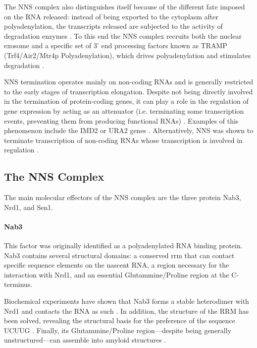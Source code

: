 The NNS complex also distinguishes itself because of the different fate imposed on the RNA released: instead of being exported to the cytoplasm after polyadenylation, the transcripts released are subjected to the activity of degradation enzymes \cite{vasiljeva:2006:nrd1}. 
To this end the NNS complex recruits both the nuclear exosome and a specific set of 3' end processing factors known as TRAMP (Trf4/Air2/Mtr4p Polyadenylation), which drives polyadenylation and stimulates degradation \cite{lacava:2005:rna, vasiljeva:2006:nrd1}.

NNS termination operates mainly on non-coding RNAs and is generally restricted to the early stages of transcription elongation. 
Despite not being directly involved in the termination of protein-coding genes, it can play a role in the regulation of gene expression by acting as an attenuator (i.e. terminating some transcription events, preventing them from producing functional RNAs) \cite{arigo:2006:regulation}. Examples of this phenomenon include the IMD2 or URA2 genes \citep{jenks:2008:properties}. Alternatively, NNS was shown to terminate transcription of non-coding RNAs whose transcription is involved in regulation \cite{thompson:2007:cytoplasmic}.

\subsection{The NNS Complex}

The main molecular effectors of the NNS complex are the three protein Nab3, Nrd1, and Sen1.


\paragraph{Nab3}

This factor was originally identified as a polyadenylated RNA binding protein. 
Nab3 contains several structural domains: a conserved \gls{rrm} that can contact specific sequence elements on the nascent RNA, a region necessary for the interaction with Nrd1, and an essential Glutammine/Proline region at the C-terminus.

Biochemical experiments have shown that Nab3 forms a stable heterodimer with Nrd1 and contacts the RNA as such \cite{conrad:2000:yeast}. 
In addition, the structure of the RRM has been solved, revealing the structural basis for the preference of the sequence UCUUG \cite{lunde:2011:structural}. 
Finally, its Glutammine/Proline region---despite being generally unstructured---can assemble into amyloid structures \cite{orourke:2015:amyloidlike}.


